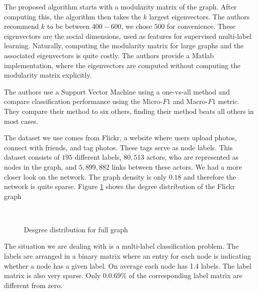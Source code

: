 \documentclass[11pt,letterpaper]{article}
\begin{document}
The proposed algorithm starts with a modularity matrix of the graph. After computing this, the algorithm then takes the $k$ largest eigenvectors. The authors recommend $k$ to be between $400-600$, we chose $500$ for convenience. These eigenvectors are the social dimensions, used as features for supervised multi-label learning. Naturally, computing the modularity matrix for large graphs and the associated eigenvectors is quite costly. The authors provide a Matlab implementation, where the eigenvectors are computed without computing the modularity matrix explicitly. \par
The authors use a Support Vector Machine using a one-vs-all method and compare classification performance using the Micro-$F1$ and Macro-$F1$ metric. They compare their method to six others, finding their method beats all others in most cases. \par

The dataset we use comes from Flickr, a website where users upload photos, connect with friends, and tag photos. These tags serve as node labels. This dataset consists of $195$ different labels, $80,513$ actors, who are represented as nodes in the graph, and $5,899,882$ links between these actors. We had a more closer look on the network. The graph density is only $0.18$ and therefore the network is quite sparse. Figure \ref{fig:fig1} shows the degree distribution of the Flickr graph

\begin{figure}[H]
	 \\
	\caption{Desgree distribution for full graph}
	\label{fig:fig1}
\end{figure}

The situation we are dealing with is a multi-label classification problem. The labels are arranged in a binary matrix where an entry for each node is indicating whether a node has a given label. On average each node has 1.4 labels. The label matrix is also very sparse. Only $0. 0.69 \%$ of the corresponding label matrix are different from zero. 
\end{document}
